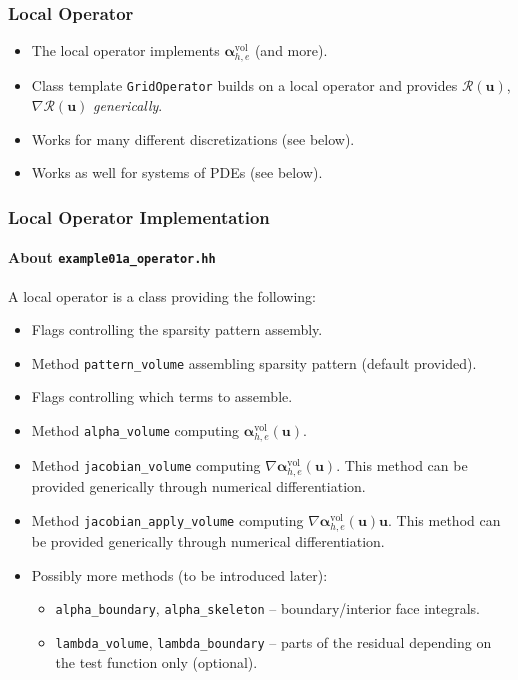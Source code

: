 \begin{frame}
\frametitle{Local Operator}
\begin{itemize}
\item The local operator implements $\bm{\alpha}_{h,e}^{\text{vol}}$ (and more).
\item Class template \lstinline{GridOperator} builds on a local operator and
provides $\mathcal{R}(\mathbf{u})$, $\nabla\mathcal{R}(\mathbf{u})$ \textit{generically}.
\item Works for many different discretizations (see below).
\item Works as well for systems of PDEs (see below).
\end{itemize}
\end{frame}

\begin{frame}
\frametitle{Local Operator Implementation}
\framesubtitle{About \lstinline{example01a_operator.hh}}
A local operator is a class providing the following:
\begin{itemize}
\item Flags controlling the sparsity pattern assembly.
\item Method \lstinline{pattern_volume} assembling sparsity pattern (default provided).
\item Flags controlling which terms to assemble.
\item Method \lstinline{alpha_volume} computing $\bm{\alpha}_{h,e}^{\text{vol}}(\mathbf{u})$.
\item Method \lstinline{jacobian_volume} computing $\nabla\bm{\alpha}_{h,e}^{\text{vol}}(\mathbf{u})$.
This method can be provided generically through numerical differentiation.
\item Method \lstinline{jacobian_apply_volume} computing $\nabla\bm{\alpha}_{h,e}^{\text{vol}}(\mathbf{u})\mathbf{u}$.
This method can be provided generically through numerical differentiation.
\item Possibly more methods (to be introduced later):
\begin{itemize}
\item \lstinline{alpha_boundary}, \lstinline{alpha_skeleton} -- boundary/interior face integrals.
\item \lstinline{lambda_volume}, \lstinline{lambda_boundary} -- parts of the residual depending on the test function only (optional).
\end{itemize}
\end{itemize}
\end{frame}

